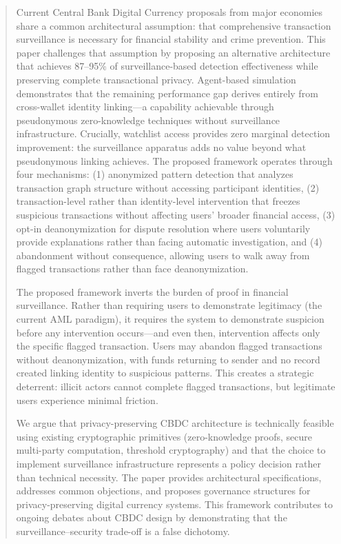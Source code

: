 \documentclass[11pt]{article}
\begin{document}
\begin{abstract}
\noindent Current Central Bank Digital Currency proposals from major economies share a common architectural assumption: that comprehensive transaction surveillance is necessary for financial stability and crime prevention. This paper challenges that assumption by proposing an alternative architecture that achieves 87--95\% of surveillance-based detection effectiveness while preserving complete transactional privacy. Agent-based simulation demonstrates that the remaining performance gap derives entirely from cross-wallet identity linking---a capability achievable through pseudonymous zero-knowledge techniques without surveillance infrastructure. Crucially, watchlist access provides zero marginal detection improvement: the surveillance apparatus adds no value beyond what pseudonymous linking achieves. The proposed framework operates through four mechanisms: (1) anonymized pattern detection that analyzes transaction graph structure without accessing participant identities, (2) transaction-level rather than identity-level intervention that freezes suspicious transactions without affecting users' broader financial access, (3) opt-in deanonymization for dispute resolution where users voluntarily provide explanations rather than facing automatic investigation, and (4) abandonment without consequence, allowing users to walk away from flagged transactions rather than face deanonymization.

The proposed framework inverts the burden of proof in financial surveillance. Rather than requiring users to demonstrate legitimacy (the current AML paradigm), it requires the system to demonstrate suspicion before any intervention occurs---and even then, intervention affects only the specific flagged transaction. Users may abandon flagged transactions without deanonymization, with funds returning to sender and no record created linking identity to suspicious patterns. This creates a strategic deterrent: illicit actors cannot complete flagged transactions, but legitimate users experience minimal friction.

We argue that privacy-preserving CBDC architecture is technically feasible using existing cryptographic primitives (zero-knowledge proofs, secure multi-party computation, threshold cryptography) and that the choice to implement surveillance infrastructure represents a policy decision rather than technical necessity. The paper provides architectural specifications, addresses common objections, and proposes governance structures for privacy-preserving digital currency systems. This framework contributes to ongoing debates about CBDC design by demonstrating that the surveillance--security trade-off is a false dichotomy.


\end{abstract}
\end{document}
